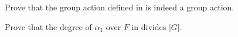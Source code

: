 \begin{exercise}
    Prove that the group action defined in  is indeed a group action.
\end{exercise}

\begin{exercise}\label{exercise-degree-of-element-under-fixed-field-action}
    Prove that the degree of $\alpha_1$ over $F$ in  divides $|G|$.
\end{exercise}


